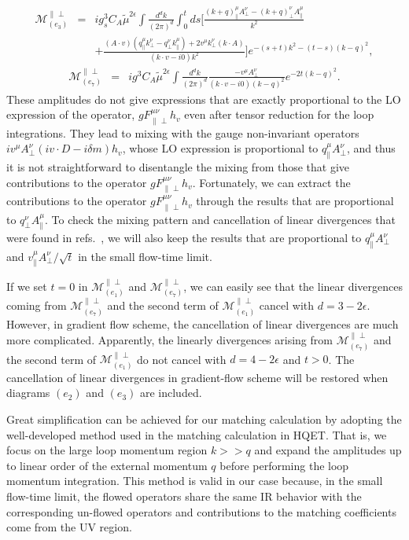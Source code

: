 \begin{eqnarray}
\label{eq:e3pperp}
\mathcal{M}_{(e_3)}^{\|\perp}
&=&ig_s^3C_A\tilde{\mu}^{2\epsilon}\int\frac{d^dk}{(2\pi)^d}\int_0^t ds \Bigg[\frac{(k+q)^{\mu}_{\|}A^{\nu}_{\perp}-(k+q)^{\nu}_{\perp}A^{\mu}_{\|}}{k^2}\nonumber\\
&&+\frac{(A\cdot v)\left(q^{\mu}_{\|}k^{\nu}_{\perp}-q^{\nu}_{\perp}k^{\mu}_{\|}\right)+2v^{\mu}k_{\perp}^{\nu}(k\cdot A)}{(k\cdot v-i0)k^2}\Bigg]e^{-(s+t)k^2-(t-s)(k-q)^2},
\end{eqnarray}
\begin{eqnarray}
\label{eq:e7pperp}
\mathcal{M}_{(e_7)}^{\|\perp}
&=&ig^3C_A\tilde{\mu}^{2\epsilon}\int\frac{d^dk}{(2\pi)^d}\frac{-v^{\mu}A_{\perp}^{\nu} }{(k\cdot v-i0)(k-q)^2}e^{-2t(k-q)^2}.
\end{eqnarray}
These amplitudes do not give expressions that are exactly proportional to the LO expression of the operator, $gF^{\mu\nu}_{\|\perp}h_v$ even after tensor reduction for the loop integrations. They lead to mixing with the gauge non-invariant operators $iv^{\mu}A_{\perp}^{\nu}(iv\cdot D - i\delta m) h_v$, whose LO expression is proportional to $q_{\|}^{\mu}A_{\perp}^{\nu}$, and thus it is not straightforward to disentangle  the mixing from those that give contributions to the operator $gF^{\mu\nu}_{\|\perp}h_v$. Fortunately, we can extract the contributions to the operator $gF^{\mu\nu}_{\|\perp}h_v$ through the results that are proportional to $q_{\perp}^{\nu}A_{\|}^{\mu}$. To check the mixing pattern and cancellation of linear divergences that were found in refs.~\cite{Dorn:1981wa,Zhang:2018diq,Wang:2019tgg}, we will also keep the results that are proportional to $q_{\|}^{\mu}A_{\perp}^{\nu}$ and $v_{\|}^{\mu}A_{\perp}^{\nu}/\sqrt{t}$ in the small flow-time limit. 

If we set $t=0$ in $\mathcal{M}_{(e_1)}^{\|\perp}$ and $\mathcal{M}_{(e_7)}^{\|\perp}$, we can easily see that the linear divergences coming from $\mathcal{M}_{(e_7)}^{\|\perp}$ and the second term of $\mathcal{M}_{(e_1)}^{\|\perp}$ cancel with $d=3-2\epsilon$. However, in gradient  flow scheme, the cancellation of linear divergences are much more complicated. Apparently, the  linearly divergences arising from $\mathcal{M}_{(e_7)}^{\|\perp}$ and the second term of $\mathcal{M}_{(e_1)}^{\|\perp}$ do not cancel with $d=4-2\epsilon$ and $t>0$. The cancellation of linear divergences in gradient-flow scheme will be restored when diagrams $(e_2)$ and $(e_3)$ are included.

Great simplification can be achieved for our matching calculation by adopting the well-developed method used in the matching calculation in HQET. That is, we focus on the large loop momentum region $k >> q$ and expand the amplitudes up to linear order of the external momentum $q$ before performing the loop momentum integration.
This method is valid in our case because, in the small flow-time limit, the flowed operators share the same IR behavior with the corresponding un-flowed operators and contributions to the matching coefficients come from the UV region.

